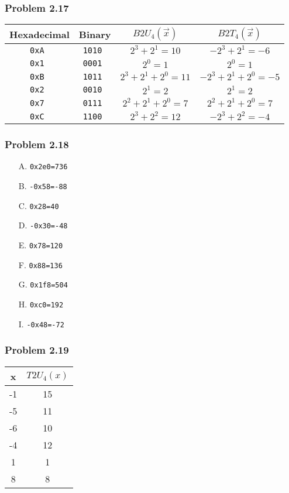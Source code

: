 \documentclass[a4paper]{article}
\begin{document}
\subsubsection*{Problem 2.17}
\begin{tabular}{c|c|c|c}
    Hexadecimal &Binary     &$B2U_4(\vec{x})$   &$B2T_4(\vec{x})$\\
    \hline
    \tt{0xA}    &\tt{1010}  &$2^3+2^1=10$       &$-2^3+2^1=-6$\\
    \tt{0x1}    &\tt{0001}  &$2^0=1$            &$2^0=1$\\
    \tt{0xB}    &\tt{1011}  &$2^3+2^1+2^0=11$   &$-2^3+2^1+2^0=-5$\\
    \tt{0x2}    &\tt{0010}  &$2^1=2$            &$2^1=2$\\
    \tt{0x7}    &\tt{0111}  &$2^2+2^1+2^0=7$    &$2^2+2^1+2^0=7$\\
    \tt{0xC}    &\tt{1100}  &$2^3+2^2=12$       &$-2^3+2^2=-4$
\end{tabular}

\subsubsection*{Problem 2.18}
\begin{enumerate}
    \item [A.] \tt{0x2e0=736}
    \item [B.] \tt{-0x58=-88}
    \item [C.] \tt{0x28=40}
    \item [D.] \tt{-0x30=-48}
    \item [E.] \tt{0x78=120}
    \item [F.] \tt{0x88=136}
    \item [G.] \tt{0x1f8=504}
    \item [H.] \tt{0xc0=192}
    \item [I.] \tt{-0x48=-72}
\end{enumerate}

\subsubsection*{Problem 2.19}
\begin{tabular}{cc}
    x&$T2U_4(x)$\\
    \hline
    -1&15\\
    -5&11\\
    -6&10\\
    -4&12\\
    1&1\\
    8&8
\end{tabular}
\end{document}
